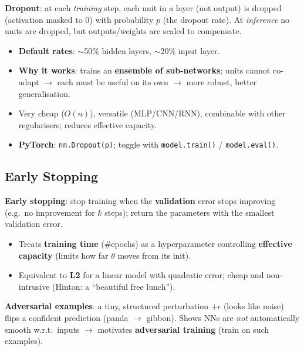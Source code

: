 \documentclass[10pt,a4paper]{article}
\begin{document}
	\begin{definitionbox}
		\textbf{Dropout}: at each \emph{training} step, each unit in a layer (not output) is dropped (activation masked to 0) with probability $p$ (the dropout rate). At \emph{inference} no units are dropped, but outputs/weights are scaled to compensate.
	\end{definitionbox}

	\begin{itemize}[leftmargin=*]
		\item \textbf{Default rates}: $\sim$50\% hidden layers, $\sim$20\% input layer.
		\item \textbf{Why it works}: trains an \textbf{ensemble of sub-networks}; units cannot co-adapt $\rightarrow$ each must be useful on its own $\rightarrow$ more robust, better generalisation.
		\item Very cheap ($O(n)$), versatile (MLP/CNN/RNN), combinable with other regularisers; reduces effective capacity.
		\item \textbf{PyTorch}: \texttt{nn.Dropout(p)}; toggle with \texttt{model.train()} / \texttt{model.eval()}.
	\end{itemize}

	\subsection{Early Stopping}

	\begin{definitionbox}
		\textbf{Early stopping}: stop training when the \textbf{validation} error stops improving (e.g.\ no improvement for $k$ steps); return the parameters with the smallest validation error.
	\end{definitionbox}

	\begin{itemize}[leftmargin=*]
		\item Treats \textbf{training time} (\#epochs) as a hyperparameter controlling \textbf{effective capacity} (limits how far $\theta$ moves from its init).
		\item Equivalent to \textbf{L2} for a linear model with quadratic error; cheap and non-intrusive (Hinton: a ``beautiful free lunch'').
	\end{itemize}

	\begin{importantbox}
		\textbf{Adversarial examples}: a tiny, structured perturbation $+\epsilon$ (looks like noise) flips a confident prediction (panda $\to$ gibbon). Shows NNs are \emph{not} automatically smooth w.r.t.\ inputs $\rightarrow$ motivates \textbf{adversarial training} (train on such examples).
	\end{importantbox}
\end{document}
